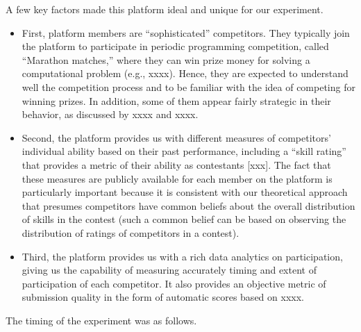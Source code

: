 \documentclass[11pt, titlepage]{article}
\begin{document}
A few key factors made this platform ideal and unique for our
experiment.

\begin{itemize}
\item
  First, platform members are ``sophisticated'' competitors. They
  typically join the platform to participate in periodic programming
  competition, called ``Marathon matches,'' where they can win prize
  money for solving a computational problem (e.g., xxxx). Hence, they
  are expected to understand well the competition process and to be
  familiar with the idea of competing for winning prizes. In addition,
  some of them appear fairly strategic in their behavior, as discussed
  by xxxx and xxxx.
\item
  Second, the platform provides us with different measures of
  competitors' individual ability based on their past performance,
  including a ``skill rating'' that provides a metric of their ability
  as contestants {[}xxx{]}. The fact that these measures are publicly
  available for each member on the platform is particularly important
  because it is consistent with our theoretical approach that presumes
  competitors have common beliefs about the overall distribution of
  skills in the contest (such a common belief can be based on observing
  the distribution of ratings of competitors in a contest).
\item
  Third, the platform provides us with a rich data analytics on
  participation, giving us the capability of measuring accurately timing
  and extent of participation of each competitor. It also provides an
  objective metric of submission quality in the form of automatic scores
  based on xxxx.
\end{itemize}

The timing of the experiment was as follows.
\end{document}
